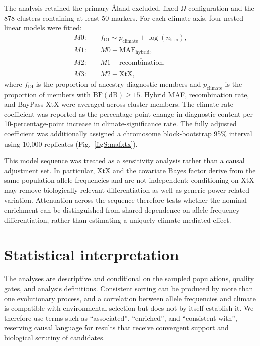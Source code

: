 \documentclass[11pt]{article}
\begin{document}
The analysis retained the primary \AA{}land-excluded, fixed-\(\Omega\)
configuration and the 878 clusters containing at least 50 markers. For each
climate axis, four nested linear models were fitted:
\begin{align*}
M0:\quad & f_{\mathrm{DI}} \sim p_{\mathrm{climate}}+\log(n_{\mathrm{loci}}),\\
M1:\quad & M0+\overline{\mathrm{MAF}}_{\mathrm{hybrid}},\\
M2:\quad & M1+\overline{\mathrm{recombination}},\\
M3:\quad & M2+\overline{\mathrm{XtX}},
\end{align*}
where \(f_{\mathrm{DI}}\) is the proportion of ancestry-diagnostic members and
\(p_{\mathrm{climate}}\) is the proportion of members with
\(\mathrm{BF(dB)}\geq15\). Hybrid MAF, recombination rate, and BayPass XtX were
averaged across cluster members. The climate-rate coefficient was reported as
the percentage-point change in diagnostic content per 10-percentage-point
increase in climate-significance rate. The fully adjusted coefficient was
additionally assigned a chromosome block-bootstrap 95\% interval using 10,000
replicates (Fig.~\ref{figS:mafxtx}).

This model sequence was treated as a sensitivity analysis rather than a causal
adjustment set. In particular, XtX and the covariate Bayes factor derive from
the same population allele frequencies and are not independent; conditioning
on XtX may remove biologically relevant differentiation as well as generic
power-related variation. Attenuation across the sequence therefore tests
whether the nominal enrichment can be distinguished from shared dependence on
allele-frequency differentiation, rather than estimating a uniquely
climate-mediated effect.

\section{Statistical interpretation}

The analyses are descriptive and conditional on the sampled populations,
quality gates, and analysis definitions. Consistent sorting can be produced by
more than one evolutionary process, and a correlation between allele
frequencies and climate is compatible with environmental selection but does
not by itself establish it. We therefore use terms such as
``associated'', ``enriched'', and ``consistent with'', reserving causal
language for results that receive convergent support and biological scrutiny
of candidates.
\end{document}
